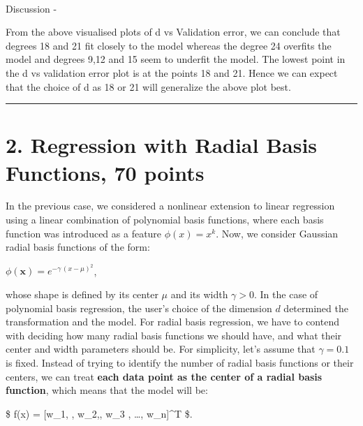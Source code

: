 \documentclass[11pt]{article}
\begin{document}
    \begin{center}
    \end{center}
    { \hspace*{\fill} \\}
    
    Discussion -

From the above visualised plots of d vs Validation error, we can
conclude that degrees 18 and 21 fit closely to the model whereas the
degree 24 overfits the model and degrees 9,12 and 15 seem to underfit
the model. The lowest point in the d vs validation error plot is at the
points 18 and 21. Hence we can expect that the choice of d as 18 or 21
will generalize the above plot best.

    \begin{center}\rule{0.5\linewidth}{0.5pt}\end{center}

\hypertarget{regression-with-radial-basis-functions-70-points}{%
\section{\texorpdfstring{2. \textbf{Regression with Radial Basis
Functions}, 70
points}{2.  Regression with Radial Basis Functions, 70 points}}\label{regression-with-radial-basis-functions-70-points}}

    In the previous case, we considered a nonlinear extension to linear
regression using a linear combination of polynomial basis functions,
where each basis function was introduced as a feature \(\phi(x) = x^k\).
Now, we consider Gaussian radial basis functions of the form:

\(\phi(\mathbf{x}) = e^{-\gamma \, (x - \mu)^2}\),

whose shape is defined by its center \(\mu\) and its width
\(\gamma > 0\). In the case of polynomial basis regression, the user's
choice of the dimension \(d\) determined the transformation and the
model. For radial basis regression, we have to contend with deciding how
many radial basis functions we should have, and what their center and
width parameters should be. For simplicity, let's assume that
\(\gamma = 0.1\) is fixed. Instead of trying to identify the number of
radial basis functions or their centers, we can treat \textbf{each data
point as the center of a radial basis function}, which means that the
model will be:

\$ f(x) = {[}w\_1, , w\_2,, w\_3 , \ldots, w\_n{]}\^{}T
\$.
\end{document}
